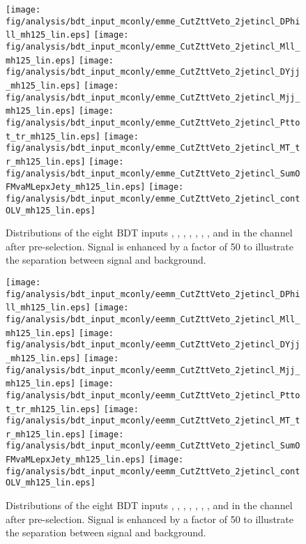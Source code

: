 \begin{figure}[p!]
  \centering
   \texttt{[image: fig/analysis/bdt\_input\_mconly/emme\_CutZttVeto\_2jetincl\_DPhill\_mh125\_lin.eps]}
   \texttt{[image: fig/analysis/bdt\_input\_mconly/emme\_CutZttVeto\_2jetincl\_Mll\_mh125\_lin.eps]}
   \texttt{[image: fig/analysis/bdt\_input\_mconly/emme\_CutZttVeto\_2jetincl\_DYjj\_mh125\_lin.eps]}
   \texttt{[image: fig/analysis/bdt\_input\_mconly/emme\_CutZttVeto\_2jetincl\_Mjj\_mh125\_lin.eps]}
   \texttt{[image: fig/analysis/bdt\_input\_mconly/emme\_CutZttVeto\_2jetincl\_Pttot\_tr\_mh125\_lin.eps]}
   \texttt{[image: fig/analysis/bdt\_input\_mconly/emme\_CutZttVeto\_2jetincl\_MT\_tr\_mh125\_lin.eps]}
   \texttt{[image: fig/analysis/bdt\_input\_mconly/emme\_CutZttVeto\_2jetincl\_SumOFMvaMLepxJety\_mh125\_lin.eps]}
   \texttt{[image: fig/analysis/bdt\_input\_mconly/emme\_CutZttVeto\_2jetincl\_contOLV\_mh125\_lin.eps]}
   \caption{Distributions
   of the eight BDT inputs \dphill, \mll, \dyjj, \mjj, \pTtot, \mT, \SumMlj, and \lepEtaCent
   in the \emme channel after pre-selection. Signal is enhanced by a
   factor of 50 to illustrate the separation between signal and background.}
  \label{chap:analysis:fig:bdt_inputs_mconly_df}
\end{figure}

\begin{figure}[p!]
  \centering
   \texttt{[image: fig/analysis/bdt\_input\_mconly/eemm\_CutZttVeto\_2jetincl\_DPhill\_mh125\_lin.eps]}
   \texttt{[image: fig/analysis/bdt\_input\_mconly/eemm\_CutZttVeto\_2jetincl\_Mll\_mh125\_lin.eps]}
   \texttt{[image: fig/analysis/bdt\_input\_mconly/eemm\_CutZttVeto\_2jetincl\_DYjj\_mh125\_lin.eps]}
   \texttt{[image: fig/analysis/bdt\_input\_mconly/eemm\_CutZttVeto\_2jetincl\_Mjj\_mh125\_lin.eps]}
   \texttt{[image: fig/analysis/bdt\_input\_mconly/eemm\_CutZttVeto\_2jetincl\_Pttot\_tr\_mh125\_lin.eps]}
   \texttt{[image: fig/analysis/bdt\_input\_mconly/eemm\_CutZttVeto\_2jetincl\_MT\_tr\_mh125\_lin.eps]}
   \texttt{[image: fig/analysis/bdt\_input\_mconly/eemm\_CutZttVeto\_2jetincl\_SumOFMvaMLepxJety\_mh125\_lin.eps]}
   \texttt{[image: fig/analysis/bdt\_input\_mconly/eemm\_CutZttVeto\_2jetincl\_contOLV\_mh125\_lin.eps]}
   \caption{Distributions of the eight BDT inputs
   \dphill, \mll, \dyjj, \mjj, \pTtot, \mT, \SumMlj, and \lepEtaCent
   in the \eemm channel after pre-selection. Signal is enhanced by a
   factor of 50 to illustrate the separation between signal and background.}
  \label{chap:analysis:fig:bdt_inputs_mconly_sf}
\end{figure}

